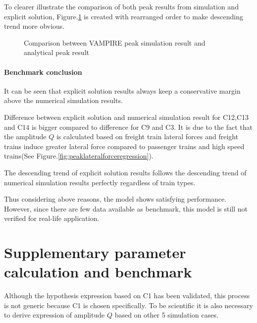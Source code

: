 To clearer illustrate the comparison of both peak results from simulation and explicit solution, Figure.\ref{fig:comparisonpeaksimulationanalytical} is created with rearranged order to make descending trend more obvious.

\begin{figure}[h!]
\centering
{}
\caption{Comparison between VAMPIRE peak simulation result and analytical peak result}
\label{fig:comparisonpeaksimulationanalytical}
\end{figure}

\paragraph{Benchmark conclusion}

It can be seen that explicit solution results always keep a conservative margin above the numerical simulation results. 

Difference between explicit solution and numerical simulation result for C12,C13 and C14 is bigger compared to difference for C9 and C3. It is due to the fact that the amplitude $Q$ is calculated based on freight train lateral forces and freight trains induce greater lateral force compared to passenger trains and high speed trains(See Figure.\ref{fig:peaklateralforceregression}).

The descending trend of explicit solution results follows the descending trend of numerical simulation results perfectly regardless of train types. 

Thus considering above reasons, the model shows satisfying performance. However, since there are few data available as benchmark, this model is still not verified for real-life application.

\section{Supplementary parameter calculation and benchmark}\label{sec:supplementaryparametercalculation}
Although the hypothesis expression based on C1 has been validated, this process is not generic because C1 is chosen specifically. To be scientific it is also necessary to derive expression of amplitude $Q$ based on other 5 simulation cases. 

